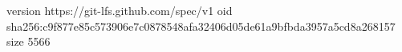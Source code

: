 version https://git-lfs.github.com/spec/v1
oid sha256:c9f877e85c573906e7c0878548afa32406d05de61a9bfbda3957a5cd8a268157
size 5566
